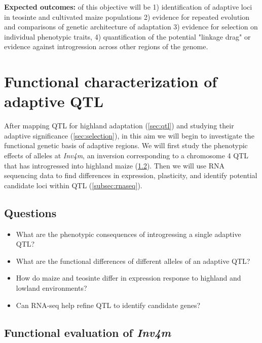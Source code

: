 {\bf Expected outcomes:}  of this objective will be 1) identification of adaptive loci in teosinte and cultivated maize populations 2) evidence for repeated evolution and comparisons of genetic architecture of adaptation 3) evidence for selection on individual phenotypic traits, 4) quantification of the potential "linkage drag" or evidence against introgression across other regions of the genome.

\section{Functional characterization of adaptive QTL} \label{sec:funchar}

After mapping QTL for highland adaptation (\ref{sec:qtl}) and studying their adaptive significance (\ref{sec:selection}), in this aim we will begin to investigate the functional genetic basis of adaptive regions.  We will first study the phenotypic effects of alleles at \emph{Inv4m}, an inversion corresponding to a chromosome 4 QTL that has introgressed into highland maize  (\ref{subsec:nils}).  Then we will use RNA sequencing data to find differences in expression, plasticity, and identify potential candidate loci within QTL (\ref{subsec:rnaseq}).

\subsection{Questions}
\begin{itemize}[topsep=0pt,itemsep=-1ex,partopsep=1ex,parsep=1ex]
\item What are the phenotypic consequences of introgressing a single adaptive QTL?
\item What are the functional differences of different alleles of an adaptive QTL?
\item How do maize and teosinte differ in expression response to highland and lowland environments?
\item Can RNA-seq help refine QTL to identify candidate genes?
\end{itemize}

\subsection{Functional evaluation of \emph{Inv4m}} \label{subsec:nils}

